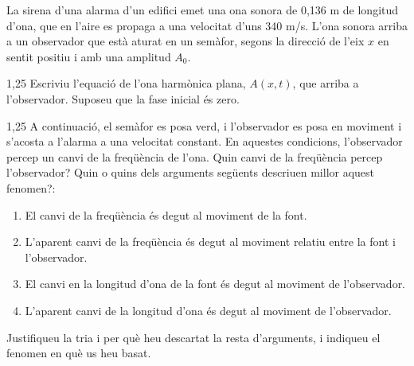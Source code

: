 La sirena d'una alarma d'un edifici emet una ona sonora de 0,136 m de longitud d'ona, que en l'aire es propaga a una velocitat d'uns 340 m/s. L'ona sonora arriba a un observador que està aturat en un semàfor, segons la direcció de l'eix $x$ en sentit positiu i amb una amplitud $A_0$.

\begin{apartat}{1,25}
Escriviu l'equació de l'ona harmònica plana, $A(x,t)$, que arriba a l'observador. Suposeu que la fase inicial és zero.
\end{apartat}

\begin{apartat}{1,25}
A continuació, el semàfor es posa verd, i l'observador es posa en moviment i s'acosta a l'alarma a una velocitat constant. En aquestes condicions, l'observador percep un canvi de la freqüència de l'ona. Quin canvi de la freqüència percep l'observador? Quin o quins dels arguments següents descriuen millor aquest fenomen?:

\begin{enumerate}
\item El canvi de la freqüència és degut al moviment de la font.
\item L'aparent canvi de la freqüència és degut al moviment relatiu entre la font i l'observador.
\item El canvi en la longitud d'ona de la font és degut al moviment de l'observador.
\item L'aparent canvi de la longitud d'ona és degut al moviment de l'observador.
\end{enumerate}

Justifiqueu la tria i per què heu descartat la resta d'arguments, i indiqueu el fenomen en què us heu basat.
\end{apartat}
